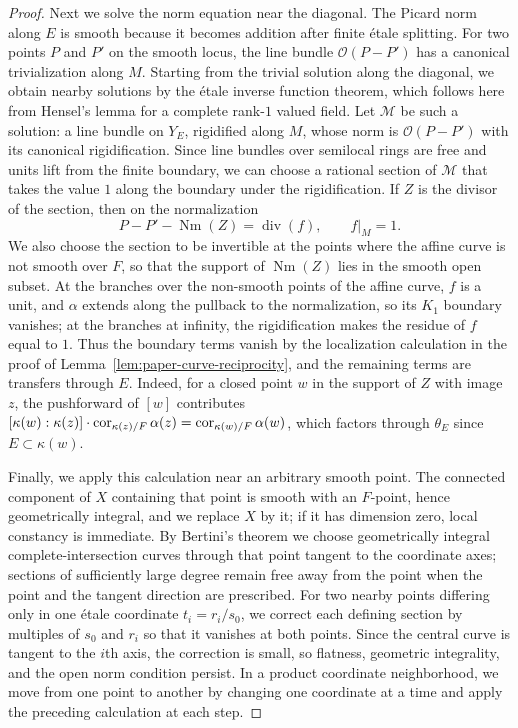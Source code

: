 \begin{proof}
Next we solve the norm equation near the diagonal.
The Picard norm along $E$ is smooth because it becomes addition after finite \'etale splitting.
For two points $P$ and $P'$ on the smooth locus, the line bundle $\mathcal O(P-P')$ has a canonical trivialization along $M$.
Starting from the trivial solution along the diagonal, we obtain nearby solutions by the \'etale inverse function theorem, which follows here from Hensel's lemma for a complete rank-$1$ valued field.
Let $\mathcal M$ be such a solution: a line bundle on $Y_E$, rigidified along $M$, whose norm is $\mathcal O(P-P')$ with its canonical rigidification.
Since line bundles over semilocal rings are free and units lift from the finite boundary, we can choose a rational section of $\mathcal M$ that takes the value $1$ along the boundary under the rigidification.
If $Z$ is the divisor of the section, then on the normalization
\[
 P-P'-\operatorname{Nm}(Z)=\operatorname{div}(f),\qquad f|_M=1.
\]
We also choose the section to be invertible at the points where the affine curve is not smooth over $F$, so that the support of $\operatorname{Nm}(Z)$ lies in the smooth open subset.
At the branches over the non-smooth points of the affine curve, $f$ is a unit, and $\alpha$ extends along the pullback to the normalization, so its $K_1$ boundary vanishes; at the branches at infinity, the rigidification makes the residue of $f$ equal to $1$.
Thus the boundary terms vanish by the localization calculation in the proof of Lemma~\ref{lem:paper-curve-reciprocity}, and the remaining terms are transfers through $E$.
Indeed, for a closed point $w$ in the support of $Z$ with image $z$, the pushforward of $[w]$ contributes $[\kappa(w):\kappa(z)]\cdot\operatorname{cor}_{\kappa(z)/F}\alpha(z)=\operatorname{cor}_{\kappa(w)/F}\alpha(w)$, which factors through $\theta_E$ since $E\subset\kappa(w)$.

Finally, we apply this calculation near an arbitrary smooth point.
The connected component of $X$ containing that point is smooth with an $F$-point, hence geometrically integral, and we replace $X$ by it; if it has dimension zero, local constancy is immediate.
By Bertini's theorem we choose geometrically integral complete-intersection curves through that point tangent to the coordinate axes; sections of sufficiently large degree remain free away from the point when the point and the tangent direction are prescribed.
For two nearby points differing only in one \'etale coordinate $t_i=r_i/s_0$, we correct each defining section by multiples of $s_0$ and $r_i$ so that it vanishes at both points.
Since the central curve is tangent to the $i$th axis, the correction is small, so flatness, geometric integrality, and the open norm condition persist.
In a product coordinate neighborhood, we move from one point to another by changing one coordinate at a time and apply the preceding calculation at each step.
\end{proof}

